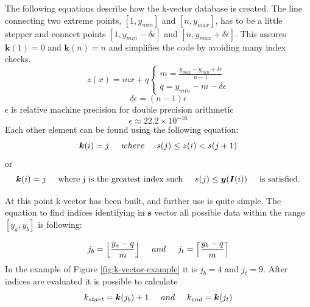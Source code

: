 \documentclass[12pt,a4paper,oneside]{article}
\begin{document}
The following equations describe how the k-vector database is created. The line connecting two extreme points, $[1, y_{min}]$ and $[n, y_{max}]$, has to be a little stepper and connect points $[1, y_{min}-\delta\epsilon]$ and $[n, y_{max}+\delta\epsilon]$. This assures $\bm{k}(1) = 0$ and $\bm{k}(n	) = n$ and simplifies the code by avoiding many index checks.
\begin{equation}
z(x) = mx + q \begin{cases}m = \frac{y_{max} - y_{min} + \delta\epsilon}{n - 1} \\
q = y_{min} - m - \delta\epsilon \end{cases}
\end{equation}
\begin{equation}
\delta\epsilon = (n - 1)\epsilon
\end{equation}
$\epsilon$ is relative machine precision for double precision arithmetic
\begin{equation}
\epsilon \approx 22.2 \times 10^{-16}
\end{equation}
Each other element can be found using the following equation:
\begin{equation}
\bm{k}(i) = j \hspace{0.5cm} where \hspace{0.5cm} s(j) \leq z(i) < s(j + 1)
\end{equation}
or
\begin{equation}
\bm{k}(i) = j \hspace{0.5cm} \textnormal{where j is the greatest index such} \hspace{0.5cm} s(j) \leq \bm{y}	(\bm{I}(i)) \hspace{0.5cm} \textnormal{is satisfied.}
\end{equation}

At this point k-vector has been built, and further use is quite simple. The equation to find indices identifying in $\bm{s}$ vector all possible data within the range $[y_a, y_b ]$ is following:

\begin{equation}
j_b = \Big\lfloor\frac{y_a - q}{m}\Big\rfloor \hspace{0.5cm} and \hspace{0.5cm} j_t = \Big\lceil\frac{y_b - q}{m}\Big\rceil
\end{equation}
In the example of Figure \ref{fig:k-vector-example} it is $j_b = 4$ and $j_t = 9$. After indices are evaluated it is possible to calculate
\begin{equation}
k_{start} = \bm{k}(j_b) + 1 \hspace{0.5cm} and \hspace{0.5cm} k_{end} = \bm{k}(j_t)
\end{equation}
\end{document}
